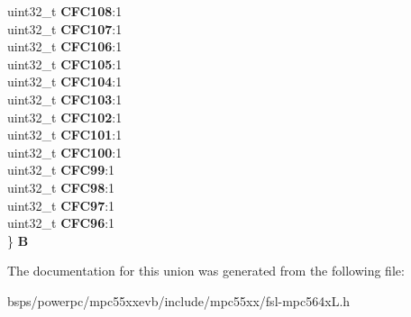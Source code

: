 \begin{DoxyCompactItemize}
\begin{tabbing}
\>uint32\_t {\bfseries CFC108}:1\\
\>uint32\_t {\bfseries CFC107}:1\\
\>uint32\_t {\bfseries CFC106}:1\\
\>uint32\_t {\bfseries CFC105}:1\\
\>uint32\_t {\bfseries CFC104}:1\\
\>uint32\_t {\bfseries CFC103}:1\\
\>uint32\_t {\bfseries CFC102}:1\\
\>uint32\_t {\bfseries CFC101}:1\\
\>uint32\_t {\bfseries CFC100}:1\\
\>uint32\_t {\bfseries CFC99}:1\\
\>uint32\_t {\bfseries CFC98}:1\\
\>uint32\_t {\bfseries CFC97}:1\\
\>uint32\_t {\bfseries CFC96}:1\\
\} {\bfseries B}\\

\end{tabbing}\end{DoxyCompactItemize}


The documentation for this union was generated from the following file\+:\begin{DoxyCompactItemize}
\item 
bsps/powerpc/mpc55xxevb/include/mpc55xx/fsl-\/mpc564x\+L.\+h\end{DoxyCompactItemize}
